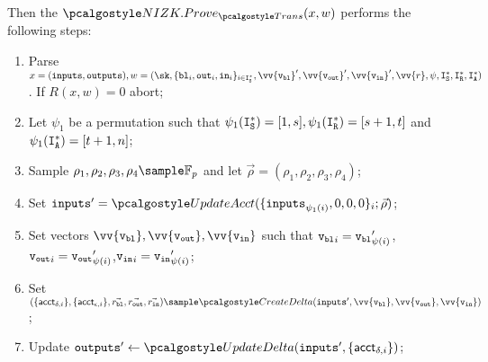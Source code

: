 Then the $\nizkprove_{\trans}(x,w)$ performs the following steps:
\begin{enumerate}
    \item Parse $x=(\inputs, \outputs), w = (\sk, \{{\varbl}_i, {\varout}_i, {\varin}_i\}_{i \in \isset^*}, \vv{\vbl}^\prime, \vv{\vout}^\prime, \vv{\vin}^\prime, \vv{r}, \psi, \isset^*, \irset^*, \ianset^*)$. If $R(x,w) = 0$ abort;
    \vspace{0.1cm}

    \item Let $\psi_1$ be a permutation such that $\psi_1(\mathtt{I}_{\mathtt{S}}^*) = [1,s], \psi_1(\mathtt{I}_{\mathtt{R}}^*) = [s+1,t]$ and $\psi_1(\mathtt{I}_{\mathtt{A}}^*) = [t+1, n]$;

    \item Sample $\rho_1, \rho_2, \rho_3, \rho_4 \sample \mathbb{F}_p$ and let $\vec{\rho} = (\rho_1, \rho_2, \rho_3, \rho_4)$;
    \vspace{0.1cm}

    \item Set $\inputs^\prime = \updacc(\{\inputs_{\psi_{1}(i)},0,0,0\}_i; \vec{\rho})$;
    \vspace{0.1cm}

    \item Set vectors $\vv{\vbl}, \vv{\vout}, \vv{\vin}$ such that ${\textup{\texttt{{v}}}_{\textup{\texttt{{bl}}}}}_i = {\textup{\texttt{{v}}}_{\textup{\texttt{{bl}}}}}^\prime_{\psi(i)}$, ${\textup{\texttt{{v}}}_{\textup{\texttt{{out}}}}}_i = {\textup{\texttt{{v}}}_{\textup{\texttt{{out}}}}}^\prime_{\psi(i)}$,${\textup{\texttt{{v}}}_{\textup{\texttt{{in}}}}}_i = {\textup{\texttt{{v}}}_{\textup{\texttt{{in}}}}}^\prime_{\psi(i)}$;
    \vspace{0.1cm}

    \item Set $(\{\acct_{\delta,i}\}, \{\acct_{\epsilon,i}\}, \vec{r_\varbl}, \vec{r_\varout}, \vec{r_\varin}) \sample \createdelta(\inputs', \vv{\vbl}, \vv{\vout}, \vv{\vin})$;
    \vspace{0.1cm}
    
    \item Update $\outputs' \gets \upddelta(\inputs', \{\acct_{\delta,i}\})$;
    \vspace{0.1cm}



\end{enumerate}
